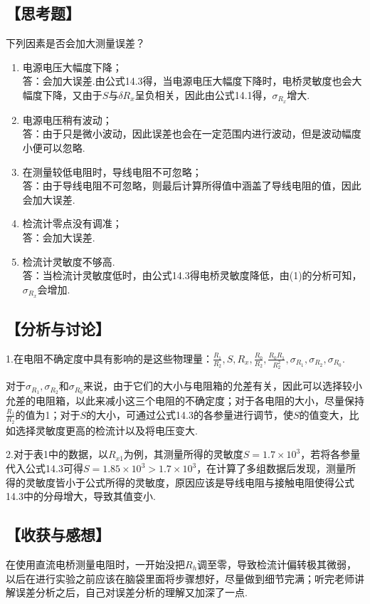 \documentclass[12pt,a4paper,UTF8]{ctexart}
\begin{document}
\subsection*{【思考题】}
下列因素是否会加大测量误差？
\begin{enumerate}[(1)]
\item 电源电压大幅度下降；\\
答：会加大误差.由公式14.3得，当电源电压大幅度下降时，电桥灵敏度也会大幅度下降，又由于$S$与$\delta R_x$呈负相关，因此由公式14.1得，$\sigma_{R_x}$增大.
\item 电源电压稍有波动；\\
答：由于只是微小波动，因此误差也会在一定范围内进行波动，但是波动幅度小便可以忽略.
\item 在测量较低电阻时，导线电阻不可忽略；\\
答：由于导线电阻不可忽略，则最后计算所得值中涵盖了导线电阻的值，因此会加大误差.
\item 检流计零点没有调准；\\
答：会加大误差.
\item 检流计灵敏度不够高.\\
答：当检流计灵敏度低时，由公式14.3得电桥灵敏度降低，由(1)的分析可知，$\sigma_{R_x}$会增加.
\end{enumerate}

\subsection*{【分析与讨论】}
1.在电阻不确定度中具有影响的是这些物理量：$\frac{R_1}{R_2},S,R_x,\frac{R_0}{R_2},\frac{R_0R_1}{R_2^2},\sigma_{R_1},\sigma_{R_2},\sigma_{R_0}$.\par
对于$\sigma_{R_1},\sigma_{R_2}$和$\sigma_{R_0}$来说，由于它们的大小与电阻箱的允差有关，因此可以选择较小允差的电阻箱，以此来减小这三个电阻的不确定度；对于各电阻的大小，尽量保持$\frac{R_1}{R_2}$的值为1；对于$S$的大小，可通过公式14.3的各参量进行调节，使$S$的值变大，比如选择灵敏度更高的检流计以及将电压变大.\par
2.对于表1中的数据，以$R_{x1}$为例，其测量所得的灵敏度$S=1.7\times10^3$，若将各参量代入公式14.3可得$S=1.85\times10^3>1.7\times10^3$，在计算了多组数据后发现，测量所得的灵敏度皆小于公式所得的灵敏度，原因应该是导线电阻与接触电阻使得公式14.3中的分母增大，导致其值变小.

\subsection*{【收获与感想】}
在使用直流电桥测量电阻时，一开始没把$R_h$调至零，导致检流计偏转极其微弱，以后在进行实验之前应该在脑袋里面将步骤想好，尽量做到细节完满；听完老师讲解误差分析之后，自己对误差分析的理解又加深了一点.
\end{document}
